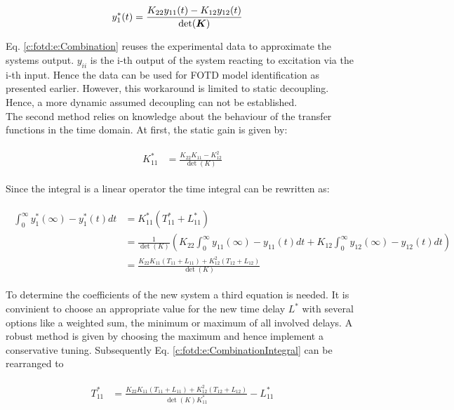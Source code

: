 \begin{align}
\begin{split}
y_{1}^*(t) &= \frac{K_{22} y_{11}(t) - K_{12} y_{12}(t)}{\det(\mbox{\boldmath$K$})}
\end{split}
\label{c:fotd:e:Combination}
\end{align}

Eq. \ref{c:fotd:e:Combination} reuses the experimental data to approximate the systems output. $y_{ii}$ is the i-th output of the system reacting to excitation via the i-th input. Hence the data can be used for FOTD model identification as presented earlier. However, this workaround is limited to static decoupling. Hence, a more dynamic assumed decoupling can not be established.\\

The second method relies on knowledge about the behaviour of the transfer functions in the time domain. At first, the static gain is given by:

\begin{align}
\begin{split}
K_{11}^* &= \frac{K_{22} K_{11} - K_{12}^2}{\det(K)}
\end{split}
\label{c:fotd:e:CombinationGain}
\end{align}

Since the integral is a linear operator the time integral can be rewritten as:

\begin{align}
\begin{split}
\int_0^\infty y_{1}^*(\infty) - y_1^*(t) dt &= K_{11}^* (T_{11}^*+L_{11}^*) \\
&= \frac{1}{\det(K)} \left( K_{22} \int_0^\infty y_{11}(\infty) - y_{11}(t) dt + K_{12} \int_0^\infty y_{12}(\infty) - y_{12}(t) dt\right) \\
&= \frac{K_{22} K_{11} (T_{11}+L_{11}) + K_{12}^2 (T_{12}+L_{12})}{\det(K)} 
\end{split}
\label{c:fotd:e:CombinationIntegral}
\end{align}

To determine the coefficients of the new system a third equation is needed. It is convinient to choose an appropriate value for the new time delay $L^*$ with several options like a weighted sum, the minimum or maximum of all involved delays. A robust method is given by choosing the maximum and hence implement a conservative tuning. Subsequently Eq. \ref{c:fotd:e:CombinationIntegral} can be rearranged to

\begin{align}
\begin{split}
T_{11}^* &= \frac{K_{22} K_{11} (T_{11}+L_{11}) + K_{12}^2 (T_{12}+L_{12})}{\det(K)K_{11}^*} - L_{11}^*
\end{split}
\label{c:fotd:e:CombinationTimeConstant}
\end{align}

